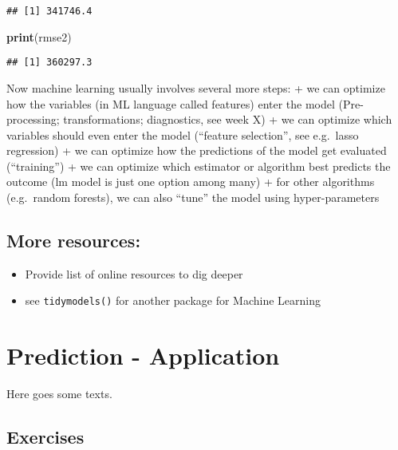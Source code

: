 \documentclass[
]{book}
\newenvironment{Shaded}{\begin{snugshade}}{\end{snugshade}}
\newcommand{\FunctionTok}[1]{\textcolor[rgb]{0.13,0.29,0.53}{\textbf{#1}}}
\newcommand{\NormalTok}[1]{#1}
\providecommand{\tightlist}{%
  \setlength{\itemsep}{0pt}\setlength{\parskip}{0pt}}
\begin{document}
\begin{verbatim}
## [1] 341746.4
\end{verbatim}

\begin{Shaded}
\begin{Highlighting}[]
\FunctionTok{print}\NormalTok{(rmse2)}
\end{Highlighting}
\end{Shaded}

\begin{verbatim}
## [1] 360297.3
\end{verbatim}

Now machine learning usually involves several more steps:
+ we can optimize how the variables (in ML language called features) enter the model (Pre-processing; transformations; diagnostics, see week X)
+ we can optimize which variables should even enter the model (``feature selection'', see e.g.~lasso regression)
+ we can optimize how the predictions of the model get evaluated (``training'')
+ we can optimize which estimator or algorithm best predicts the outcome (lm model is just one option among many)
+ for other algorithms (e.g.~random forests), we can also ``tune'' the model using hyper-parameters

\hypertarget{more-resources}{%
\section{More resources:}\label{more-resources}}

\begin{itemize}
\tightlist
\item
  Provide list of online resources to dig deeper
\item
  see \texttt{tidymodels()} for another package for Machine Learning
\end{itemize}

\hypertarget{pm-a}{%
\chapter{Prediction - Application}\label{pm-a}}

Here goes some texts.

\hypertarget{exercises}{%
\section{Exercises}\label{exercises}}
\end{document}
